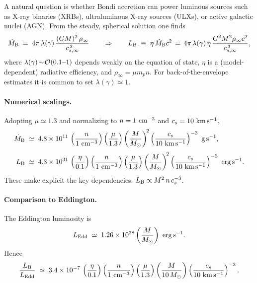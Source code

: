 A natural question is whether Bondi accretion can power luminous sources such as
X-ray binaries (XRBs), ultraluminous X-ray sources (ULXs), or active galactic nuclei (AGN).
From the steady, spherical solution one finds
\begin{equation}
\dot M_{\rm B} \;=\; 4\pi\,\lambda(\gamma)\,\frac{(GM)^2\,\rho_\infty}{c_{s,\infty}^{\,3}}
\qquad\Rightarrow\qquad
L_{\rm B} \;\equiv\; \eta\,\dot M_{\rm B} c^2
\,=\, 4\pi\,\lambda(\gamma)\,\eta\,\frac{G^2 M^2 \rho_\infty c^2}{c_{s,\infty}^{\,3}},
\label{eq:bondi_luminosity}
\end{equation}
where $\lambda(\gamma)\!\sim\!{\cal O}(0.1\!\!-\!\!1)$ depends weakly on the equation of state,
$\eta$ is a (model-dependent) radiative efficiency, and $\rho_\infty=\mu m_p n$.
For back-of-the-envelope estimates it is common to set $\lambda(\gamma)\simeq 1$.

\paragraph{Numerical scalings.}
Adopting $\mu\simeq 1.3$ and normalizing to $n=1~{\rm cm^{-3}}$ and $c_s=10~{\rm km\,s^{-1}}$,
\begin{align}
\dot M_{\rm B} &\;\simeq\; 4.8\times 10^{11}\,
\left(\frac{n}{1~{\rm cm^{-3}}}\right)
\left(\frac{\mu}{1.3}\right)
\left(\frac{M}{M_\odot}\right)^{\!2}
\left(\frac{c_s}{10~{\rm km\,s^{-1}}}\right)^{-3}
\ {\rm g\,s^{-1}},\\[3pt]
L_{\rm B} &\;\simeq\; 4.3\times 10^{31}\,
\left(\frac{\eta}{0.1}\right)
\left(\frac{n}{1~{\rm cm^{-3}}}\right)
\left(\frac{\mu}{1.3}\right)
\left(\frac{M}{M_\odot}\right)^{\!2}
\left(\frac{c_s}{10~{\rm km\,s^{-1}}}\right)^{-3}
\ {\rm erg\,s^{-1}}.
\label{eq:bondi_numeric}
\end{align}
These make explicit the key dependencies: $L_{\rm B}\propto M^2\,n\,c_s^{-3}$.

\paragraph{Comparison to Eddington.}
The Eddington luminosity is
\begin{equation}
L_{\rm Edd} \;\simeq\; 1.26\times 10^{38}\left(\frac{M}{M_\odot}\right)\ {\rm erg\,s^{-1}}.
\end{equation}
Hence
\begin{equation}
\frac{L_{\rm B}}{L_{\rm Edd}}
\;\simeq\;
3.4\times 10^{-7}\,
\left(\frac{\eta}{0.1}\right)
\left(\frac{n}{1~{\rm cm^{-3}}}\right)
\left(\frac{\mu}{1.3}\right)
\left(\frac{M}{10\,M_\odot}\right)
\left(\frac{c_s}{10~{\rm km\,s^{-1}}}\right)^{-3}.
\end{equation}

